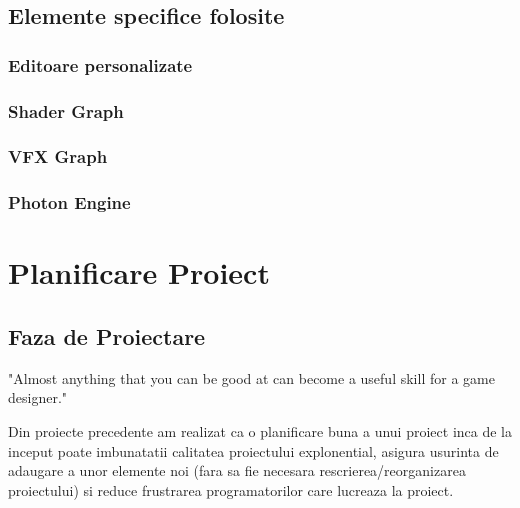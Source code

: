 \documentclass[12pt, a4paper]{article}
\begin{document}
	\subsection{Elemente specifice folosite}	
	
	
	
	
	
	\subsubsection{Editoare personalizate}
	
	
	
	
	
	\subsubsection{Shader Graph}
	
	
	
	
	
	\subsubsection{VFX Graph}
	
	
	
	
	
	\subsubsection{Photon Engine}
	
	
	
	
	
	\section{Planificare Proiect}
	
	
	
	
	
	\subsection{Faza de Proiectare}
	
	"Almost anything that you can be good at can become a useful
	skill for a game designer." \cite{bookOfLenses}
	\newline
	
	Din proiecte precedente am realizat ca o planificare buna a unui proiect inca de la inceput poate imbunatatii calitatea proiectului explonential, asigura usurinta de adaugare a unor elemente noi (fara sa fie necesara rescrierea/reorganizarea proiectului) si reduce frustrarea programatorilor care lucreaza la proiect.
	\newline
	
\end{document}
